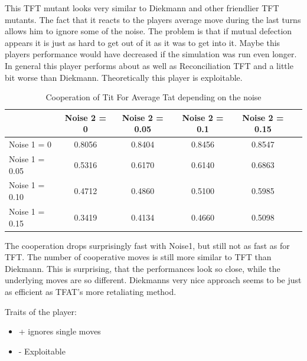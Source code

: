 This TFT mutant looks very similar to Diekmann and other friendlier TFT mutants. The fact that it reacts to the players average move during the last turns allows him to ignore some of the noise. The problem is that if mutual defection appears it is just as hard to get out of it as it was to get into it. Maybe this players performance would have decreased if the simulation was run even longer. In general this player performs about as well as Reconciliation TFT and a little bit worse than Diekmann. Theoretically this player is exploitable. 

\begin{table}[h]
 \begin{center}
\caption{Cooperation of Tit For Average Tat depending on the noise} \vspace{3mm}
\begin{tabular}{|l|c|c|c|c|c|}
\hline
   	& Noise 2 = 0 & Noise 2 = 0.05& Noise 2 = 0.1& Noise 2 = 0.15 \\
  \hline
  Noise 1 = 0 	&    0.8056  &  0.8404  &  0.8456  &  0.8547 \\
 \hline
  Noise 1 = 0.05	 &     0.5316  &  0.6170 &   0.6140   & 0.6863 \\
 \hline
  Noise 1 = 0.10 	&    0.4712  &  0.4860  &  0.5100  &  0.5985 \\
 \hline
  Noise 1 = 0.15 	&       0.3419  &  0.4134 &   0.4660 &   0.5098 \\
 \hline
\end{tabular}
 \end{center}
\end{table}

The cooperation drops surprisingly fast with Noise1, but still not as fast as for TFT. The number of cooperative moves is still more similar to TFT than Diekmann. This is surprising, that the performances look so close, while the underlying moves are so different. Diekmanns very nice approach seems to be just as efficient as TFAT's more retaliating method. 

Traits of the player:

\renewcommand{\labelitemi}{}
\begin{itemize}
	\item + ignores single moves
	\item - Exploitable
\end{itemize}
\renewcommand{\labelitemi}{$\bullet$}
 
